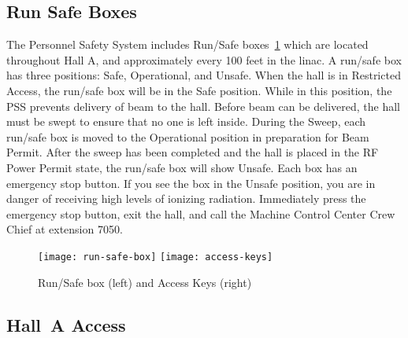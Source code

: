 \begin{safetyen}{10}{10}
\subsection{ Run Safe Boxes}
\end{safetyen}

The Personnel Safety System includes Run/Safe 
boxes~\ref{fig:run-safe-box} which are located
throughout Hall A, and approximately every 100 feet in the linac. A
run/safe box has three positions: Safe, Operational, and Unsafe. When
the hall is in Restricted Access, the run/safe box will be in the Safe
position. While in this position, the PSS prevents delivery of beam to
the hall. Before beam can be delivered, the hall must be swept to
ensure that no one is left inside. During the Sweep, each run/safe box
is moved to the Operational position in preparation for Beam
Permit. After the sweep has been completed and the hall is placed in
the RF Power Permit state, the run/safe box will show Unsafe. Each box
has an emergency stop button. If you see the box in the Unsafe
position, you are in danger of receiving high levels of ionizing
radiation. Immediately press the emergency stop button, exit the hall,
and call the Machine Control Center Crew Chief at extension 7050.

\begin{figure}
\begin{center}
  \texttt{[image: run-safe-box]}\hspace{0.25in}
  \texttt{[image: access-keys]}
\end{center}
\caption[Introduction: Runs/Safe box, Access Keys]{Run/Safe box (left) 
  and Access Keys (right)}
\label{fig:run-safe-box}
\end{figure}

\begin{safetyen}{10}{10}
\section{Hall~A Access} 
\end{safetyen}


